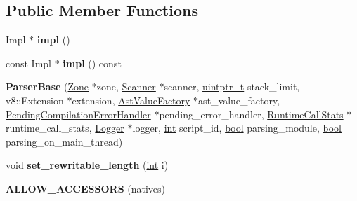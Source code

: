 \subsection*{Public Member Functions}
\begin{DoxyCompactItemize}
\item 
\mbox{\label{classv8_1_1internal_1_1ParserBase_a0f281ecf018e981cebed658a9cae8f13}} 
Impl $\ast$ {\bfseries impl} ()
\item 
\mbox{\label{classv8_1_1internal_1_1ParserBase_a35a0dd41174cf548869bdc78be51a857}} 
const Impl $\ast$ {\bfseries impl} () const
\item 
\mbox{\label{classv8_1_1internal_1_1ParserBase_a97e468a8a89f12d1faff90b2f82cb5bb}} 
{\bfseries Parser\+Base} (\mbox{\hyperlink{classv8_1_1internal_1_1Zone}{Zone}} $\ast$zone, \mbox{\hyperlink{classv8_1_1internal_1_1Scanner}{Scanner}} $\ast$scanner, \mbox{\hyperlink{classuintptr__t}{uintptr\+\_\+t}} stack\+\_\+limit, v8\+::\+Extension $\ast$extension, \mbox{\hyperlink{classv8_1_1internal_1_1AstValueFactory}{Ast\+Value\+Factory}} $\ast$ast\+\_\+value\+\_\+factory, \mbox{\hyperlink{classv8_1_1internal_1_1PendingCompilationErrorHandler}{Pending\+Compilation\+Error\+Handler}} $\ast$pending\+\_\+error\+\_\+handler, \mbox{\hyperlink{classv8_1_1internal_1_1RuntimeCallStats}{Runtime\+Call\+Stats}} $\ast$runtime\+\_\+call\+\_\+stats, \mbox{\hyperlink{classv8_1_1internal_1_1Logger}{Logger}} $\ast$logger, \mbox{\hyperlink{classint}{int}} script\+\_\+id, \mbox{\hyperlink{classbool}{bool}} parsing\+\_\+module, \mbox{\hyperlink{classbool}{bool}} parsing\+\_\+on\+\_\+main\+\_\+thread)
\item 
\mbox{\label{classv8_1_1internal_1_1ParserBase_ac66e198f5d323109318d54723fca8bea}} 
void {\bfseries set\+\_\+rewritable\+\_\+length} (\mbox{\hyperlink{classint}{int}} i)
\item 
\mbox{\label{classv8_1_1internal_1_1ParserBase_afc0578ae35eb81c1f66a70001975b60e}} 
{\bfseries A\+L\+L\+O\+W\+\_\+\+A\+C\+C\+E\+S\+S\+O\+RS} (natives)
\item 
\mbox{\label{classv8_1_1internal_1_1ParserBase_a98407baab1e64cb1b5ccf71ca94bf667}} 

\end{DoxyCompactItemize}
